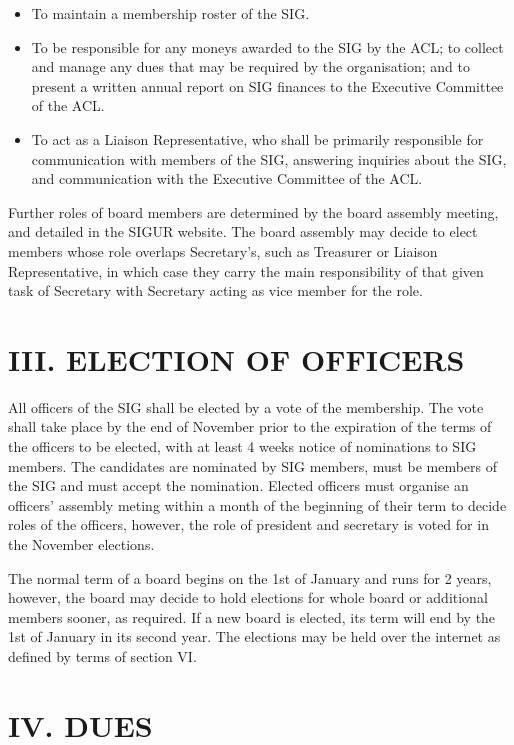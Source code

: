 \documentclass[11pt,a4paper]{article}
\begin{document}
\begin{itemize}
\item    To maintain a membership roster of the SIG.
\item    To be responsible for any moneys awarded to the SIG by the ACL; to collect and manage any dues that may be required by the organisation; and to present a written annual report on SIG finances to the Executive Committee of the ACL.
\item    To act as a Liaison Representative, who shall be primarily responsible for communication with members of the SIG, answering inquiries about the SIG, and communication with the Executive Committee of the ACL.
\end{itemize}

Further roles of board members are determined by the board assembly meeting, and detailed in the SIGUR website. The board assembly may decide to elect members whose role overlaps Secretary's, such as Treasurer or Liaison Representative, in which case they carry the main responsibility of that given task of Secretary with Secretary acting as vice member for the role.

\section*{III. ELECTION OF OFFICERS}

All officers of the SIG shall be elected by a vote of the membership. The vote shall take place by the end of November prior to the expiration of the terms of the officers to be elected, with at least 4 weeks notice of nominations to SIG members. The candidates are nominated by SIG members, must be members of the SIG and must accept the nomination. Elected officers must organise an officers' assembly meting within a month of the beginning of their term to decide roles of the officers, however, the role of president and secretary is voted for in the November elections.

The normal term of a board begins on the 1st of January and runs for 2 years, however, the board may decide to hold elections for whole board or additional members sooner, as required. If a new board is elected, its term will end by the 1st of January in its second year. The elections may be held over the internet as defined by terms of section VI.

\section*{IV. DUES}
\end{document}
